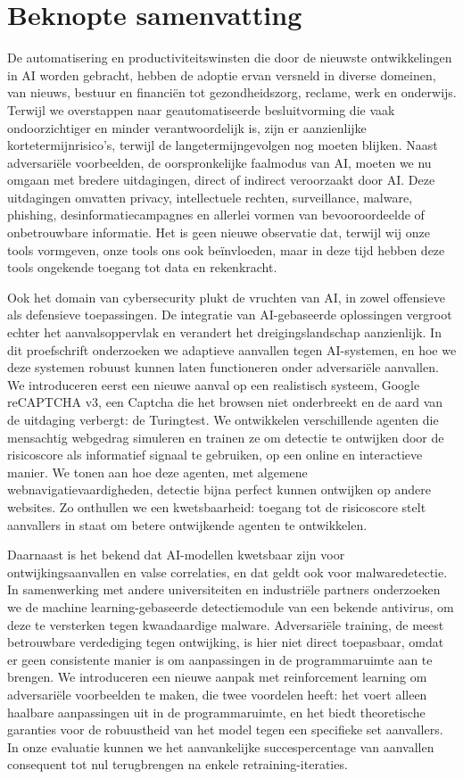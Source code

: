 \chapter{Beknopte samenvatting}

De automatisering en productiviteitswinsten die door de nieuwste ontwikkelingen in AI worden gebracht, hebben de adoptie ervan versneld in diverse domeinen, van nieuws, bestuur en financiën tot gezondheidszorg, reclame, werk en onderwijs. Terwijl we overstappen naar geautomatiseerde besluitvorming die vaak ondoorzichtiger en minder verantwoordelijk is, zijn er aanzienlijke kortetermijnrisico's, terwijl de langetermijngevolgen nog moeten blijken. Naast adversariële voorbeelden, de oorspronkelijke faalmodus van AI, moeten we nu omgaan met bredere uitdagingen, direct of indirect veroorzaakt door AI. Deze uitdagingen omvatten privacy, intellectuele rechten, surveillance, malware, phishing, desinformatiecampagnes en allerlei vormen van bevooroordeelde of onbetrouwbare informatie. Het is geen nieuwe observatie dat, terwijl wij onze tools vormgeven, onze tools ons ook beïnvloeden, maar in deze tijd hebben deze tools ongekende toegang tot data en rekenkracht.

Ook het domain van cybersecurity plukt de vruchten van AI, in zowel offensieve als defensieve toepassingen. De integratie van AI-gebaseerde oplossingen vergroot echter het aanvalsoppervlak en verandert het dreigingslandschap aanzienlijk. In dit proefschrift onderzoeken we adaptieve aanvallen tegen AI-systemen, en hoe we deze systemen robuust kunnen laten functioneren onder adversariële aanvallen. We introduceren eerst een nieuwe aanval op een realistisch systeem, Google reCAPTCHA v3, een Captcha die het browsen niet onderbreekt en de aard van de uitdaging verbergt: de Turingtest. We ontwikkelen verschillende agenten die mensachtig webgedrag simuleren en trainen ze om detectie te ontwijken door de risicoscore als informatief signaal te gebruiken, op een online en interactieve manier. We tonen aan hoe deze agenten, met algemene webnavigatievaardigheden, detectie bijna perfect kunnen ontwijken op andere websites. Zo onthullen we een kwetsbaarheid: toegang tot de risicoscore stelt aanvallers in staat om betere ontwijkende agenten te ontwikkelen.

Daarnaast is het bekend dat AI-modellen kwetsbaar zijn voor ontwijkingsaanvallen en valse correlaties, en dat geldt ook voor malwaredetectie. In samenwerking met andere universiteiten en industriële partners onderzoeken we de machine learning-gebaseerde detectiemodule van een bekende antivirus, om deze te versterken tegen kwaadaardige malware. Adversariële training, de meest betrouwbare verdediging tegen ontwijking, is hier niet direct toepasbaar, omdat er geen consistente manier is om aanpassingen in de programmaruimte aan te brengen. We introduceren een nieuwe aanpak met reinforcement learning om adversariële voorbeelden te maken, die twee voordelen heeft: het voert alleen haalbare aanpassingen uit in de programmaruimte, en het biedt theoretische garanties voor de robuustheid van het model tegen een specifieke set aanvallers. In onze evaluatie kunnen we het aanvankelijke succespercentage van aanvallen consequent tot nul terugbrengen na enkele retraining-iteraties.

